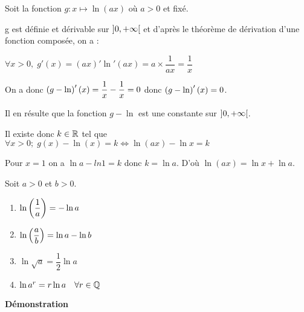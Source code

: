 Soit la fonction  $g : x \mapsto \ln(ax)$ où $ a > 0 $ et fixé.

g est définie et dérivable sur $]0 , +\infty[$ et d'après le théorème de dérivation d'une fonction composée,
on a :

$ \forall x > 0,\;  g'(x) = (ax)'\ln'(ax) = a \times \dfrac{1}{ax}=\dfrac{1}{x}$


On a donc $\left(g - \ln\right)' (x) = \dfrac{1}{x}-\dfrac{1}{x}= 0$ donc $ \left(g - \ln \right)'(x) = 0$.

Il en résulte que la fonction $g - \ln$  est une constante sur $]0 , +\infty[$.

Il existe donc  $k \in \mathbb{R}$ tel que $\forall x > 0 ;\; g (x)- \ln (x) = k \Leftrightarrow \ln(ax) - \ln x = k$

Pour  $x = 1$  on a $ \ln a - ln 1 
= k$ donc  $k = \ln a$. D’où $\ln(ax) = \ln x + \ln a$.

\begin{corollary} 
Soit $ a > 0$  et  $ b > 0$.
\begin{enumerate}
\item $  \ln \left(\dfrac{1}{a}\right)= - \ln a$
\item $\ln \left(\dfrac{a}{b} \right)= \ln a-  \ln b$
 \item $  \ln \sqrt{a} = \dfrac{1}{2} \ln a$
 \item $ \ln a^{r} = r\ln a \quad \forall r\in\mathbb{Q}$
\end{enumerate}

\end{corollary} 




\textbf{Démonstration}

